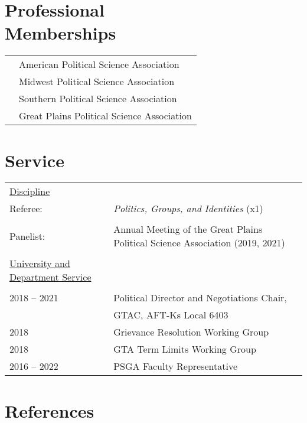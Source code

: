 \documentclass[margin,line,pifont,palatino,courier]{res}
\begin{document}
\begin{resume}


\section{\sc Professional\\ Memberships}

\begin{tabular}{@{}p{0.8in}p{4in}}

  & American Political Science Association\\
  & Midwest Political Science Association\\
  & Southern Political Science Association\\
  & Great Plains Political Science Association\\
\end{tabular}


\section{\sc Service}

\begin{tabular}{@{}p{0.8in}p{4in}}
  \\
  \underline{Discipline} &\\
  Referee: & \textit{Politics, Groups, and Identities} (x1) \\
  \\
  Panelist: & Annual Meeting of the Great Plains Political
                         Science Association (2019, 2021)\\
  \\
  \underline{University and Department Service} &\\
  \\
  2018 -- 2021 & Political Director and Negotiations Chair,\\
              &  GTAC, AFT-Ks Local 6403 \\
  2018 & Grievance Resolution Working Group \\
  2018 & GTA Term Limits Working Group\\
  2016 -- 2022 & PSGA Faculty Representative\\
\end{tabular}


\newpage

\section{\sc References}


\end{resume}
\end{document}
